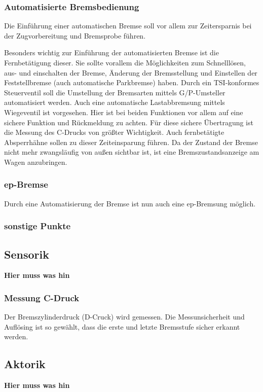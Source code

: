\subsubsection{Automatisierte Bremsbedienung}
Die Einführung einer automatischen Bremse soll vor allem zur Zeitersparnis bei der Zugvorbereitung und \gls{Bremsprobe} führen.\par
Besonders wichtig zur Einführung der automatisierten Bremse ist die Fernbetätigung dieser. Sie sollte vorallem die Möglichkeiten zum Schnelllösen, aus- und einschalten der Bremse, Änderung der Bremsstellung und Einstellen der Feststellbremse (auch automatische Parkbremse) haben.
Durch ein TSI-konformes Steuerventil soll die Umstellung der Bremsarten mittels G/P-Umsteller automatisiert werden. Auch eine automatische Lastabbremsung mittels Wiegeventil ist vorgesehen. Hier ist bei beiden Funktionen vor allem auf eine sichere Funktion und Rückmeldung zu achten.
Für diese sichere Übertragung ist die Messung des C-Drucks von größter Wichtigkeit.
Auch fernbetätigte Absperrhähne sollen zu dieser Zeiteinsparung führen. 
Da der Zustand der Bremse nicht mehr zwangsläufig von außen sichtbar ist, ist eine Bremszustandsanzeige am Wagen anzubringen. 

\subsubsection{ep-Bremse}
Durch eine Automatisierung der Bremse ist nun auch eine ep-Bremsung möglich.

\subsubsection{sonstige Punkte}

\subsection{Sensorik}
\textbf{Hier muss was hin}
\subsubsection{Messung C-Druck}
Der Bremszylinderdruck (D-Cruck) wird gemessen. 
Die Messunsicherheit und Auflösing ist so gewählt, dass die erste und letzte Bremsstufe %
sicher erkannt werden. %

\subsection{Aktorik}
\textbf{Hier muss was hin}

